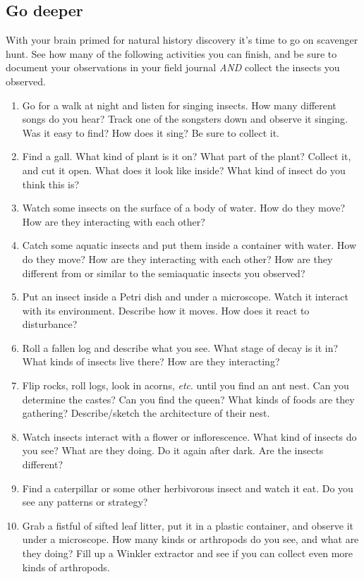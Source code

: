 \documentclass[letterpaper, 11pt]{article}
\begin{document}
\subsection*{Go deeper}
With your brain primed for natural history discovery it's time to go on scavenger hunt. See how many of the following activities you can finish, and be sure to document your observations in your field journal \textit{AND} collect the insects you observed.
\begin{enumerate}
\item Go for a walk at night and listen for singing insects. How many different songs do you hear? Track one of the songsters down and observe it singing. Was it easy to find? How does it sing? Be sure to collect it.
\item Find a gall. What kind of plant is it on? What part of the plant? Collect it, and cut it open. What does it look like inside? What kind of insect do you think this is?
\item Watch some insects on the surface of a body of water. How do they move? How are they interacting with each other?
\item Catch some aquatic insects and put them inside a container with water. How do they move? How are they interacting with each other? How are they different from or similar to the semiaquatic insects you observed?
\item Put an insect inside a Petri dish and under a microscope. Watch it interact with its environment. Describe how it moves. How does it react to disturbance?
\item Roll a fallen log and describe what you see. What stage of decay is it in? What kinds of insects live there? How are they interacting?
\item Flip rocks, roll logs, look in acorns, \textit{etc}. until you find an ant nest. Can you determine the castes? Can you find the queen? What kinds of foods are they gathering? Describe/sketch the architecture of their nest.
\item Watch insects interact with a flower or inflorescence. What kind of insects do you see? What are they doing. Do it again after dark. Are the insects different?
\item Find a caterpillar or some other herbivorous insect and watch it eat. Do you see any patterns or strategy?
\item Grab a fistful of sifted leaf litter, put it in a plastic container, and observe it under a microscope. How many kinds or arthropods do you see, and what are they doing? Fill up a Winkler extractor and see if you can collect even more kinds of arthropods.
\end{enumerate}
\end{document}
